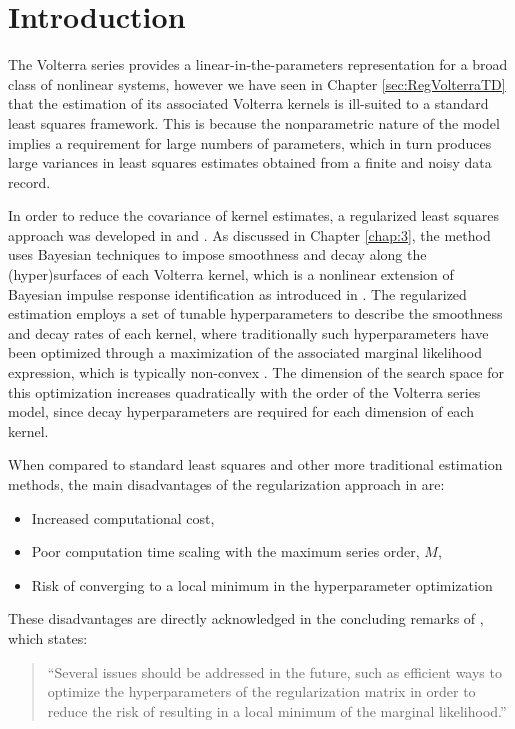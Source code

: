 \section{Introduction}

The Volterra series provides a linear-in-the-parameters representation for a broad class of nonlinear systems, however we have seen in Chapter \ref{sec:RegVolterraTD} that the estimation of its associated Volterra kernels is ill-suited to a standard least squares framework. This is because the nonparametric nature of the model implies a requirement for large numbers of parameters, which in turn produces large variances in least squares estimates obtained from a finite and noisy data record. 

In order to reduce the covariance of kernel estimates, a regularized least squares approach was developed in \cite{Birpoutsoukis2017} and \cite{Birpoutsoukis2017c}. As discussed in Chapter \ref{chap:3}, the method uses Bayesian techniques to impose smoothness and decay along the (hyper)surfaces of each Volterra kernel, which is a nonlinear extension of Bayesian impulse response identification as introduced in \cite{Pillonetto2010}. The regularized estimation employs a set of tunable hyperparameters to describe the smoothness and decay rates of each kernel, where traditionally such hyperparameters have been optimized through a maximization of the associated marginal likelihood expression, which is typically non-convex \cite{Chen2013}. The dimension of the search space for this optimization increases quadratically with the order of the Volterra series model, since decay hyperparameters are required for each dimension of each kernel.

When compared to standard least squares and other more traditional estimation methods, the main disadvantages of the regularization approach in \cite{Birpoutsoukis2017} are:
\begin{itemize} 
\item Increased computational cost,
\item Poor computation time scaling with the maximum series order, $M$,
\item Risk of converging to a local minimum in the hyperparameter optimization 
\end{itemize}
These disadvantages are directly acknowledged in the concluding remarks of \cite{Birpoutsoukis2017}, which states:
\begin{quote}
``Several issues should be addressed in the future, such as efficient ways to optimize the hyperparameters of the regularization matrix in order to reduce the risk of resulting in a local minimum of the marginal likelihood.''
\end{quote} 

